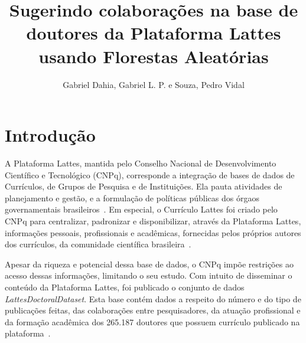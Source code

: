 \documentclass[12pt]{article}
\title{Sugerindo colaborações na base de doutores da Plataforma Lattes usando Florestas Aleatórias}
\author{Gabriel Dahia, Gabriel L. P. e Souza, Pedro Vidal}
\begin{document}
 

\maketitle

     


\section{Introdução}

A Plataforma Lattes, mantida pelo Conselho Nacional de Desenvolvimento Científico e Tecnológico (CNPq), corresponde a integração de bases de dados de Currículos, de Grupos de Pesquisa e de Instituições. Ela pauta atividades de planejamento e gestão, e a formulação de políticas públicas dos órgaos governamentais brasileiros~\cite{lattes-cnpq}.
Em especial, o Currículo Lattes foi criado pelo CNPq para centralizar, padronizar e disponibilizar, através da Plataforma Lattes, informações pessoais, profissionais e acadêmicas, fornecidas pelos próprios autores dos currículos, da comunidade científica brasileira~\cite{sucupira}.

Apesar da riqueza e potencial dessa base de dados, o CNPq impõe restrições ao acesso dessas informações, limitando o seu estudo.
Com intuito de disseminar o conteúdo da Plataforma Lattes, foi publicado o conjunto de dados \emph{LattesDoctoralDataset}.
Esta base contém dados a respeito do número e do tipo de publicações feitas, das colaborações entre pesquisadores, da atuação profissional e da formação acadêmica dos 265.187 doutores que possuem currículo publicado na plataforma~\cite{lattes-dataset}.
\end{document}
